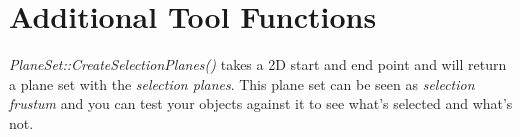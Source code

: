 \section{Additional Tool Functions}
\emph{PlaneSet::CreateSelectionPlanes()} takes a 2D start and end point and will return a plane set with the \emph{selection planes}. This plane set can be seen as \emph{selection frustum} and you can test your objects against it to see what's selected and what's not.





\cleardoublepage
